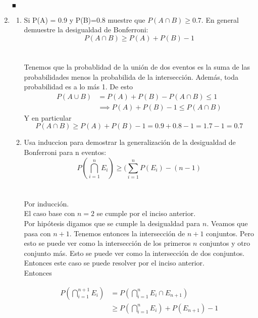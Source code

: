 \documentclass[12pt,a4paper]{report}
\begin{document}
\begin{enumerate}
{\begin{enumerate}[label=\Roman*.]
{		\begin{flushright}
			$_{\blacksquare}$
		\end{flushright}
	}
	\end{enumerate}


	}

   \item {
  	\begin{enumerate}[label=\alph*) ]
   \item {
	Si P(A) = 0.9 y P(B)=0.8 muestre que $P(A \cap B) \geq 0.7$. En general demuestre la desigualdad de Bonferroni:\\
	$$P(A \cap B) \geq P(A)+P(B) -1$$\\\\

	Tenemos que la probablidad de la unión de dos eventos es la suma de las
	probabilidades menos la probabilida de la intersección. Además, toda probabilidad
	es a lo más 1. De esto
	\begin{align*}
		P(A \cup B) &= P(A) + P(B) - P(A \cap B) \leq 1\\
								&\implies P(A) + P(B) - 1 \leq P(A \cap B)
	\end{align*}
	Y en particular
	\begin{equation*}
		P(A \cap B) \geq P(A) + P(B) - 1 = 0.9 + 0.8 - 1 = 1.7 - 1 = 0.7
	\end{equation*}

   }

   \item {
 	Usa induccion para demostrar la generalización de la desigualdad de Bonferroni para n eventos:\\
 	$$P(\bigcap\limits_{i=1}^{n} E_{i}) \geq (\sum_{i=1}^{n} P(E_{i})-(n-1)$$\\\\

 	Por inducción.	\\
	El caso base con $n = 2$ se cumple por el inciso anterior.\\
 	Por hipótesis digamos que se cumple la desigualdad para $n$.
	Veamos que pasa con $n+1$.
	Tenemos entonces la intersección de $n+1$ conjuntos. Pero esto se puede ver
	como la intersección de los primeros $n$ conjuntos y otro conjunto más.
	Esto se puede ver como la intersección de dos conjuntos. Entonces este caso se
	puede resolver por el inciso anterior.\\
	Entonces

	\begin{align*}
		P(\bigcap\limits_{i=1}^{n+1} E_{i}) &= P(\bigcap\limits_{i=1}^{n} E_{i} \cap E_{n+1})\\
																				&\geq P(\bigcap\limits_{i=1}^{n} E_{i}) + P(E_{n+1}) - 1
	\end{align*}



}
\end{enumerate}}
\end{enumerate}
\end{document}
